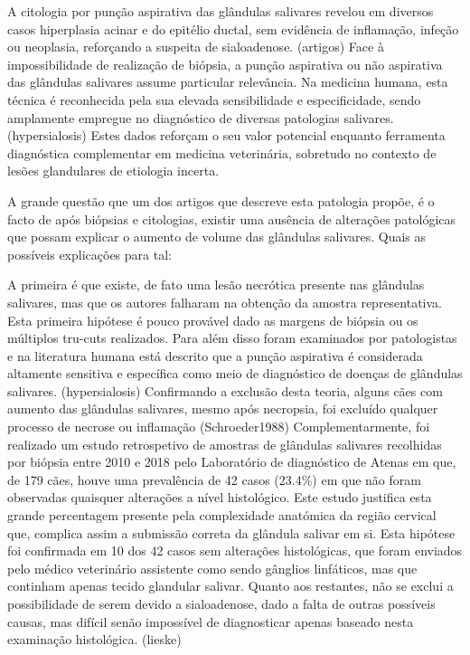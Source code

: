 A citologia por punção aspirativa das glândulas salivares revelou em diversos casos hiperplasia acinar e do epitélio ductal, sem evidência de inflamação, infeção ou neoplasia, reforçando a suspeita de sialoadenose. (artigos) Face à impossibilidade de realização de biópsia, a punção aspirativa ou não aspirativa das glândulas salivares assume particular relevância. Na medicina humana, esta técnica é reconhecida pela sua elevada sensibilidade e especificidade, sendo amplamente empregue no diagnóstico de diversas patologias salivares. (hypersialosis) Estes dados reforçam o seu valor potencial enquanto ferramenta diagnóstica complementar em medicina veterinária, sobretudo no contexto de lesões glandulares de etiologia incerta.


A grande questão que um dos artigos que descreve esta patologia propõe, é o facto de após biópsias e citologias, existir uma ausência de alterações patológicas que possam explicar o aumento de volume das glândulas salivares.
Quais as possíveis explicações para tal:


A primeira é que existe, de fato uma lesão necrótica presente nas glândulas salivares, mas que os autores falharam na obtenção da amostra representativa. Esta primeira hipótese é pouco provável dado as margens de biópsia ou os múltiplos tru-cuts realizados. Para além disso foram examinados por patologistas e na literatura humana está descrito que a punção aspirativa é considerada altamente sensitiva e específica como meio de diagnóstico de doenças de glândulas salivares. (hypersialosis) Confirmando a exclusão desta teoria, alguns cães com aumento das glândulas salivares, mesmo após necropsia, foi excluído qualquer processo de necrose ou inflamação (Schroeder1988) Complementarmente, foi realizado um estudo retrospetivo de amostras de glândulas salivares recolhidas por biópsia entre 2010 e 2018 pelo Laboratório de diagnóstico de Atenas em que, de 179 cães, houve uma prevalência de 42 casos (23.4\%) em que não foram observadas quaisquer alterações a nível histológico. Este estudo justifica esta grande percentagem presente pela complexidade anatómica da região cervical que, complica assim a submissão correta da glândula salivar em si. Esta hipótese foi confirmada em 10 dos 42 casos sem alterações histológicas, que foram enviados pelo médico veterinário assistente como sendo gânglios linfáticos, mas que continham apenas tecido glandular salivar. Quanto aos restantes, não se exclui a possibilidade de serem devido a sialoadenose, dado a falta de outras possíveis causas, mas difícil senão impossível de diagnosticar apenas baseado nesta examinação histológica. (lieske)


